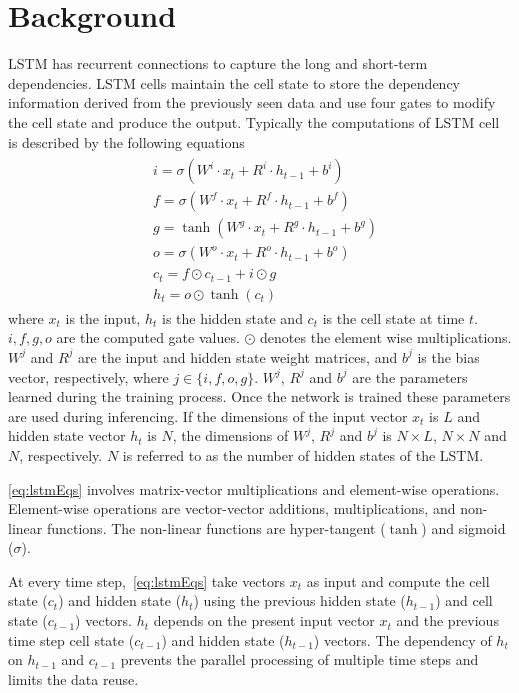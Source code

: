 \section{Background}
LSTM has recurrent connections to capture the long and short-term dependencies. LSTM cells maintain the cell state to store the dependency information derived from the previously seen data and use four gates to modify the cell state and produce the output. Typically the computations of LSTM cell is described by the following equations
\begin{align}\label{eq:lstmEqs}
	\begin{split}
		&i{=}{\sigma}(W^i{\cdot}x_t{+}R^i{\cdot}h_{t-1}{+}b^i)\\
		&f{=}{\sigma}(W^f{\cdot}x_t{+}R^f{\cdot}h_{t-1}{+}b^f)\\
		&g{=}{\tanh}(W^g{\cdot}x_t{+}R^g{\cdot}h_{t-1}{+}b^g)\\
		&o{=}{\sigma}(W^o{\cdot}x_t{+}R^o{\cdot}h_{t-1}{+}b^o)\\
		&c_{t}{=}f{\odot}c_{t-1}{+}i{\odot}g\\
		&h_{t}{=}o{\odot}{\tanh}(c_t)
	\end{split}	
\end{align}
where $x_t$ is the input, $h_t$ is the hidden state and $c_t$ is the cell state at time $t$. $i,f,g,o$ are the computed gate values. $\odot$ denotes the element wise multiplications. $W^j$ and $R^j$ are the input and hidden state weight matrices, and $b^j$ is the bias vector, respectively, where $j\in\{i,f,o,g\}$. $W^j$, $R^j$ and $b^j$ are the parameters learned during the training process. Once the network is trained these parameters are used during inferencing. 
If the dimensions of the input vector $x_t$ is $L$ and hidden state vector $h_t$ is $N$, the dimensions of $W^j$, $R^j$ and $b^j$ is $N{\times}L$, $N{\times}N$ and $N$, respectively. $N$ is referred to as the number of hidden states of the LSTM. 

\eqref{eq:lstmEqs} involves matrix-vector multiplications and element-wise operations. Element-wise operations are vector-vector additions, multiplications, and non-linear functions. The non-linear functions are hyper-tangent ($\tanh$) and sigmoid ($\sigma$).

At every time step,~\eqref{eq:lstmEqs} take vectors $x_t$ as input and compute the cell state ($c_t$) and hidden state ($h_t$) using the previous hidden state ($h_{t-1}$) and cell state ($c_{t-1}$) vectors. $h_t$ depends on the present input vector $x_t$ and the previous time step cell state ($c_{t-1}$) and hidden state ($h_{t-1}$) vectors. The dependency of $h_t$ on $h_{t-1}$ and $c_{t-1}$ prevents the parallel processing of multiple time steps and limits the data reuse. 

